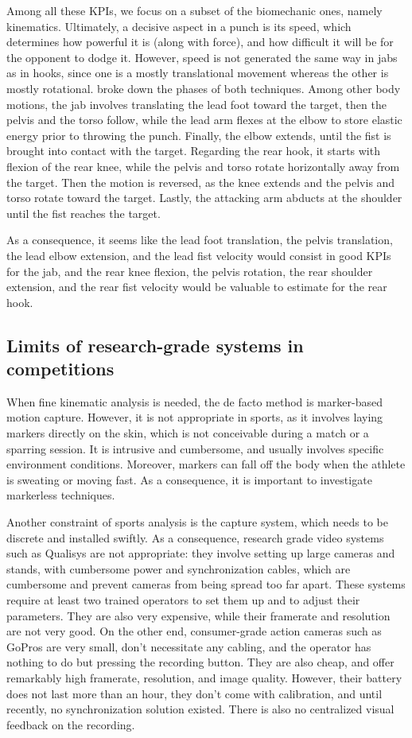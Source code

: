 Among all these KPIs, we focus on a subset of the biomechanic ones, namely kinematics. Ultimately, a decisive aspect in a punch is its speed, which determines how powerful it is (along with force), and how difficult it will be for the opponent to dodge it. However, speed is not generated the same way in jabs as in hooks, since one is a mostly translational movement whereas the other is mostly rotational. \cite{Lenetsky2020} broke down the phases of both techniques. Among other body motions, the jab involves translating the lead foot toward the target, then the pelvis and the torso follow, while the lead arm flexes at the elbow to store elastic energy prior to throwing the punch. Finally, the elbow extends, until the fist is brought into contact with the target. Regarding the rear hook, it starts with flexion of the rear knee, while the pelvis and torso rotate horizontally away from the target. Then the motion is reversed, as the knee extends and the pelvis and torso rotate toward the target. Lastly, the attacking arm abducts at the shoulder until the fist reaches the target. 

As a consequence, it seems like the lead foot translation, the pelvis translation, the lead elbow extension, and the lead fist velocity would consist in good KPIs for the jab, and the rear knee flexion, the pelvis rotation, the rear shoulder extension, and the rear fist velocity would be valuable to estimate for the rear hook.


\subsection{Limits of research-grade systems in competitions}

When fine kinematic analysis is needed, the de facto method is marker-based motion capture. However, it is not appropriate in sports, as it involves laying markers directly on the skin, which is not conceivable during a match or a sparring session. It is intrusive and cumbersome, and usually involves specific environment conditions. Moreover, markers can fall off the body when the athlete is sweating or moving fast. As a consequence, it is important to investigate markerless techniques. 

Another constraint of sports analysis is the capture system, which needs to be discrete and installed swiftly. As a consequence, research grade video systems such as Qualisys are not appropriate: they involve setting up large cameras and stands, with cumbersome power and synchronization cables, which are cumbersome and prevent cameras from being spread too far apart. These systems require at least two trained operators to set them up and to adjust their parameters. They are also very expensive, while their framerate and resolution are not very good. On the other end, consumer-grade action cameras such as GoPros are very small, don't necessitate any cabling, and the operator has nothing to do but pressing the recording button. They are also cheap, and offer remarkably high framerate, resolution, and image quality. However, their battery does not last more than an hour, they don't come with calibration, and until recently, no synchronization solution existed. There is also no centralized visual feedback on the recording.

